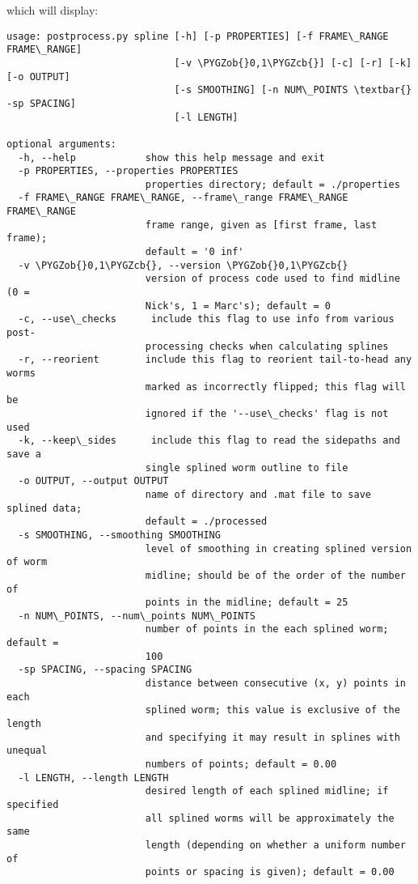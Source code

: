 \documentclass[letterpaper,10pt,openany,oneside]{sphinxmanual}
\def\PYGZob{\char`\{}
\def\PYGZcb{\char`\}}
\begin{document}

which will display:

\begin{Verbatim}[commandchars=\\\{\}]
usage: postprocess.py spline [-h] [-p PROPERTIES] [-f FRAME\_RANGE FRAME\_RANGE]
                             [-v \PYGZob{}0,1\PYGZcb{}] [-c] [-r] [-k] [-o OUTPUT]
                             [-s SMOOTHING] [-n NUM\_POINTS \textbar{} -sp SPACING]
                             [-l LENGTH]

optional arguments:
  -h, --help            show this help message and exit
  -p PROPERTIES, --properties PROPERTIES
                        properties directory; default = ./properties
  -f FRAME\_RANGE FRAME\_RANGE, --frame\_range FRAME\_RANGE FRAME\_RANGE
                        frame range, given as [first frame, last frame);
                        default = '0 inf'
  -v \PYGZob{}0,1\PYGZcb{}, --version \PYGZob{}0,1\PYGZcb{}
                        version of process code used to find midline (0 =
                        Nick's, 1 = Marc's); default = 0
  -c, --use\_checks      include this flag to use info from various post-
                        processing checks when calculating splines
  -r, --reorient        include this flag to reorient tail-to-head any worms
                        marked as incorrectly flipped; this flag will be
                        ignored if the '--use\_checks' flag is not used
  -k, --keep\_sides      include this flag to read the sidepaths and save a
                        single splined worm outline to file
  -o OUTPUT, --output OUTPUT
                        name of directory and .mat file to save splined data;
                        default = ./processed
  -s SMOOTHING, --smoothing SMOOTHING
                        level of smoothing in creating splined version of worm
                        midline; should be of the order of the number of
                        points in the midline; default = 25
  -n NUM\_POINTS, --num\_points NUM\_POINTS
                        number of points in the each splined worm; default =
                        100
  -sp SPACING, --spacing SPACING
                        distance between consecutive (x, y) points in each
                        splined worm; this value is exclusive of the length
                        and specifying it may result in splines with unequal
                        numbers of points; default = 0.00
  -l LENGTH, --length LENGTH
                        desired length of each splined midline; if specified
                        all splined worms will be approximately the same
                        length (depending on whether a uniform number of
                        points or spacing is given); default = 0.00
\end{Verbatim}
\end{document}
